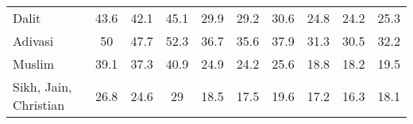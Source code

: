 \begin{tabular}{l*{9}{c}}
Dalit               &        43.6&        42.1&        45.1&        29.9&        29.2&        30.6&        24.8&        24.2&        25.3\\
Adivasi             &          50&        47.7&        52.3&        36.7&        35.6&        37.9&        31.3&        30.5&        32.2\\
Muslim              &        39.1&        37.3&        40.9&        24.9&        24.2&        25.6&        18.8&        18.2&        19.5\\
Sikh, Jain, Christian&        26.8&        24.6&          29&        18.5&        17.5&        19.6&        17.2&        16.3&        18.1\\
\bottomrule
\end{tabular}
